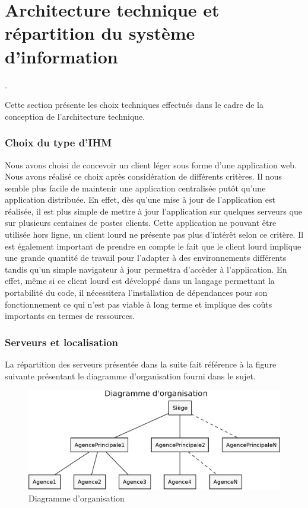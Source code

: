 
\part{Architecture technique et répartition du système d’information}

.

Cette section présente les choix techniques effectués dans le cadre de la conception de l'architecture technique.

\section{Choix du type d'IHM}

Nous avons choisi de concevoir un client léger sous forme d'une application web. Nous avons réalisé ce choix après considération de différents critères. Il nous semble plus facile de maintenir une application centralisée putôt qu'une application distribuée. En effet, dès qu'une mise à jour de l'application est réalisée, il est plus simple de mettre à jour l'application sur quelques serveurs que sur plusieurs centaines de postes clients. Cette application ne pouvant être utilisée hors ligne, un client lourd ne présente pas plus d'intérêt selon ce critère. Il est également important de prendre en compte le fait que le client lourd implique une grande quantité de travail pour l'adapter à des environnements différents tandis qu'un simple navigateur à jour permettra d'accèder à l'application. En effet, même si ce client lourd est développé dans un langage permettant la portabilité du code, il nécessitera l'installation de dépendances pour son fonctionnement ce qui n'est pas viable à long terme et implique des coûts importants en termes de ressources. 

\section{Serveurs et localisation}

La répartition des serveurs présentée dans la suite fait référence à la figure suivante présentant le diagramme d'organisation fourni dans le sujet.

\begin{figure}[H]
    \centering
	\includegraphics[scale=0.6]{figures/eps/DO}
	\caption{Diagramme d'organisation}
\end{figure}

